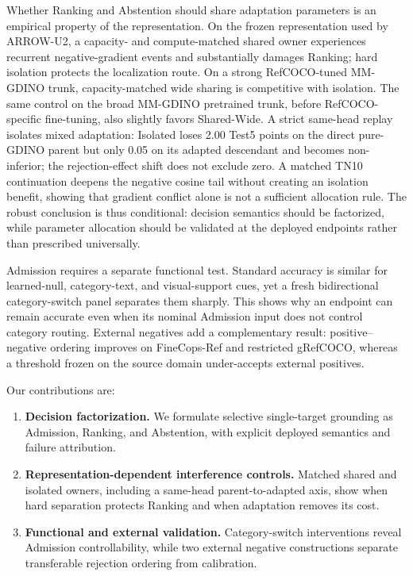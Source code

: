 Whether Ranking and Abstention should share adaptation parameters is an
empirical property of the representation.  On the frozen representation used
by ARROW-U2, a capacity- and compute-matched shared owner experiences recurrent
negative-gradient events and substantially damages Ranking; hard isolation
protects the localization route.  On a strong RefCOCO-tuned MM-GDINO trunk,
capacity-matched wide sharing is competitive with isolation.  The same control
on the broad MM-GDINO pretrained trunk, before RefCOCO-specific fine-tuning,
also slightly favors Shared-Wide.  A strict same-head replay isolates mixed
adaptation: Isolated loses 2.00 Test5 points on the direct pure-GDINO parent
but only 0.05 on its adapted descendant and becomes non-inferior; the rejection-effect
shift does not exclude zero.  A matched TN10
continuation deepens the negative cosine tail without creating an isolation
benefit, showing that gradient conflict alone is not a sufficient allocation
rule.  The robust conclusion is thus conditional: decision semantics should be
factorized, while parameter allocation should be validated at the deployed
endpoints rather than prescribed universally.

Admission requires a separate functional test.  Standard accuracy is similar
for learned-null, category-text, and visual-support cues, yet a fresh
bidirectional category-switch panel separates them sharply.  This shows why an
endpoint can remain accurate even when its nominal Admission input does not
control category routing.  External negatives add a complementary result:
positive--negative ordering improves on FineCops-Ref and restricted gRefCOCO,
whereas a threshold frozen on the source domain under-accepts external
positives.

Our contributions are:
\begin{enumerate}[leftmargin=*,itemsep=1pt,topsep=2pt]
  \item \textbf{Decision factorization.}  We formulate selective single-target
  grounding as Admission, Ranking, and Abstention, with explicit deployed
  semantics and failure attribution.
  \item \textbf{Representation-dependent interference controls.}  Matched
  shared and isolated owners, including a same-head parent-to-adapted axis, show
  when hard separation protects Ranking and when adaptation removes its cost.
  \item \textbf{Functional and external validation.}  Category-switch
  interventions reveal Admission controllability, while two external negative
  constructions separate transferable rejection ordering from calibration.
\end{enumerate}
